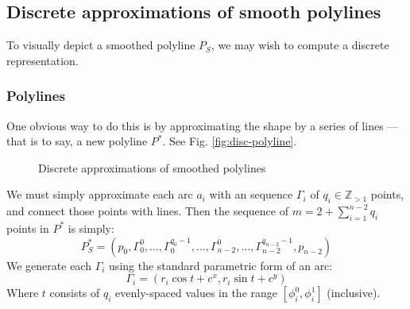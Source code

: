 \documentclass{article}
\begin{document}
\subsection{Discrete approximations of smooth polylines}
%
To visually depict a smoothed polyline $P_S$, we may wish to compute a discrete representation.
%
\subsubsection{Polylines}
%
One obvious way to do this is by approximating the shape by a series of lines --- that is to say, a new polyline $P^*$.  See Fig. \ref{fig:disc-polyline}.
%
\begin{figure}
  \centering
  \hfill
  \caption{Discrete approximations of smoothed polylines}
\end{figure}
%
We must simply approximate each arc $a_i$ with an sequence $\Gamma_i$ of $q_i \in \mathbb{Z}_{>1}$ points, and connect those points with lines.  Then the sequence of $m = 2 + \sum^{n-2}_{i=1} q_i$ points in $P^*$ is simply:
%
\begin{equation}
  \label{eq:p-star}
  P^*_S = \left(p_0, \Gamma^0_0, \ldots, \Gamma^{q_0-1}_0, \ldots, \Gamma^{0}_{n-2}, \ldots, \Gamma^{q_{n-2}-1}_{n-2},  p_{n-2}\right)
\end{equation}
%
We generate each $\Gamma_i$ using the standard parametric form of an arc:
%
\begin{equation}
  \label{eq:arc-segments}
  \Gamma_i = \left(r_i \cos t + c^x, r_i \sin t + c^y\right)
\end{equation}
%
Where $t$ consists of $q_i$ evenly-spaced values in the range $\left[\phi^0_i, \phi^1_i\right]$ (inclusive).
%
\end{document}
